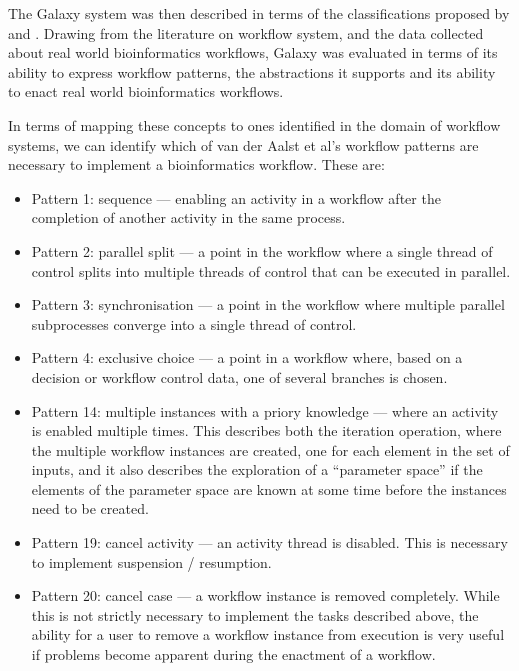 \documentclass[a4paper,10pt]{scrreprt} \usepackage[utf8]{inputenc}
\begin{document}
The Galaxy system was then described in terms of the classifications proposed by \cite{yu_taxonomy_2005} and \cite{deelman_workflows_2009}. Drawing from the literature on workflow system, and the data collected about real world bioinformatics workflows, Galaxy was evaluated in terms of its ability to express workflow patterns, the abstractions it supports and its ability to enact real world bioinformatics workflows.



In terms of mapping these concepts to ones identified in the domain of workflow systems, we can identify which of van der Aalst et al's \cite{van_der_aalst_workflow_2003} workflow patterns are necessary to implement a bioinformatics workflow. These are:

\begin{itemize}
\item Pattern 1: sequence --- enabling an activity in a workflow after the completion of another activity in the same process.
\item Pattern 2: parallel split --- a point in the workflow where a single thread of control splits into multiple threads of control that can be executed in parallel.
\item Pattern 3: synchronisation ---  a point in the workflow where multiple parallel subprocesses converge into a single thread of control.
\item Pattern 4: exclusive choice --- a point in a workflow where, based on a decision or workflow control data, one of several branches is chosen.
\item Pattern 14: multiple instances with a priory knowledge --- where an activity is enabled multiple times. This describes both the iteration operation, where the multiple workflow instances are created, one for each element in the set of inputs, and it also describes the exploration of a ``parameter space'' if the elements of the parameter space are known at some time before the instances need to be created.
\item Pattern 19: cancel activity --- an activity thread is disabled. This is necessary to implement suspension / resumption.
\item Pattern 20: cancel case --- a workflow instance is removed completely. While this is not strictly necessary to implement the tasks described above, the ability for a user to remove a workflow instance from execution is very useful if problems become apparent during the enactment of a workflow.
\end{itemize}
\end{document}
